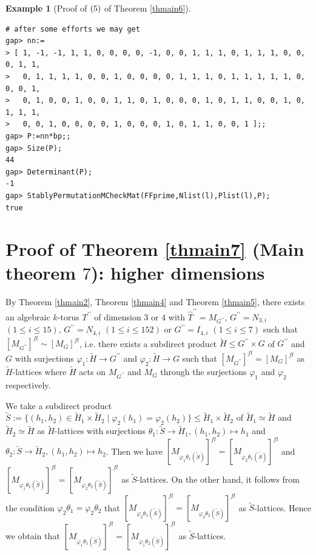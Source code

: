 \documentclass{amsart}
\theoremstyle{plain}
\theoremstyle{definition}
\newtheorem{example}[theorem]{Example}
\theoremstyle{remark}
\newcounter{sub}\def\tr{\mbox{tr }}
\begin{document}
{\begin{example}[{Proof of ${\rm (5)}$ of {Theorem \ref{thmain6}}}]
\begin{verbatim}
# after some efforts we may get 
gap> nn:=
> [ 1, -1, -1, 1, 1, 0, 0, 0, 0, -1, 0, 0, 1, 1, 1, 0, 1, 1, 1, 0, 0, 0, 1, 1, 
>   0, 1, 1, 1, 1, 0, 0, 1, 0, 0, 0, 0, 1, 1, 1, 0, 1, 1, 1, 1, 1, 0, 0, 0, 1, 
>   0, 1, 0, 0, 1, 0, 0, 1, 1, 0, 1, 0, 0, 0, 1, 0, 1, 1, 0, 0, 1, 0, 1, 1, 1, 
>   0, 0, 1, 0, 0, 0, 0, 1, 0, 0, 0, 1, 0, 1, 1, 0, 0, 1 ];;
gap> P:=nn*bp;;
gap> Size(P);
44
gap> Determinant(P);
-1
gap> StablyPermutationMCheckMat(FFprime,Nlist(l),Plist(l),P);
true
\end{verbatim}
\end{example}

\section{Proof of Theorem \ref{thmain7} (Main theorem $7$): higher dimensions}\label{S12}

%
By {Theorem \ref{thmain2}}, 
{Theorem \ref{thmain4}} and {Theorem \ref{thmain5}}, 
there exists 
an algebraic $k$-torus $T^{\prime\prime}$ of dimension $3$ or $4$ 
with $\widehat{T}^{\prime\prime}=M_{G^{\prime\prime}}$, 
$G^{\prime\prime}=N_{3,i}$ $(1\leq i\leq 15)$, 
$G^{\prime\prime}=N_{4,i}$ $(1\leq i\leq 152)$ or 
$G^{\prime\prime}=I_{4,i}$ $(1\leq i\leq 7)$ 
such that $[M_{G^{\prime\prime}}]^{fl}\sim [M_G]^{fl}$, 
i.e. there exists a subdirect product 
$\widetilde{H}\leq G^{\prime\prime}\times G$ 
of $G^{\prime\prime}$ and $G$ 
with surjections $\varphi_1: \widetilde{H} \rightarrow G^{\prime\prime}$ 
and $\varphi_2: \widetilde{H} \rightarrow G$ 
such that $[M_{G^{\prime\prime}}]^{fl}=[M_G]^{fl}$ 
as $\widetilde{H}$-lattices where $\widetilde{H}$ acts on 
$M_{G^{\prime\prime}}$ and $M_G$ through the surjections 
$\varphi_1$ and $\varphi_2$ respectively. 
 
We take a subdirect product 
$\widetilde{S}:=\{(h_1,h_2)\in\widetilde{H}_1\times \widetilde{H}_2\mid 
\varphi_2(h_1)=\varphi_2(h_2)\}\leq \widetilde{H}_1\times \widetilde{H}_2$ 
of $\widetilde{H}_1\simeq \widetilde{H}$ and 
$\widetilde{H}_2\simeq \widetilde{H}$ as $\widetilde{H}$-lattices 
with surjections 
$\theta_1: \widetilde{S}\rightarrow \widetilde{H}_1, (h_1,h_2)\mapsto h_1$ and 
$\theta_2: \widetilde{S}\rightarrow \widetilde{H}_2, (h_1,h_2)\mapsto h_2$. 
Then we have 
$[M_{\varphi_1\theta_1(\widetilde{S})}]^{fl}=[M_{\varphi_2\theta_1(\widetilde{S})}]^{fl}$ 
and 
$[M_{\varphi_1\theta_2(\widetilde{S})}]^{fl}=[M_{\varphi_2\theta_2(\widetilde{S})}]^{fl}$ as $\widetilde{S}$-lattices. 
On the other hand, it follows from the condition $\varphi_2\theta_1=\varphi_2\theta_2$ that 
$[M_{\varphi_2\theta_1(\widetilde{S})}]^{fl}=[M_{\varphi_2\theta_2(\widetilde{S})}]^{fl}$ as $\widetilde{S}$-lattices. 
Hence we obtain that 
$[M_{\varphi_1\theta_1(\widetilde{S})}]^{fl}=[M_{\varphi_1\theta_2(\widetilde{S})}]^{fl}$ as $\widetilde{S}$-lattices. 

}
\end{document}
